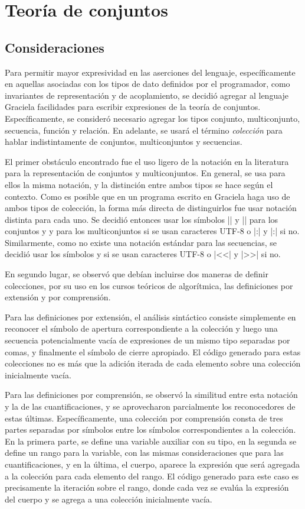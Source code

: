 {{\section{Teoría de conjuntos}
\subsection{Consideraciones}

Para permitir mayor expresividad en las aserciones del lenguaje, específicamente
en aquellas asociadas con los tipos de dato definidos por el programador, como
invariantes de representación y de acoplamiento, se decidió agregar al lenguaje
Graciela facilidades para escribir expresiones de la teoría de conjuntos.
Específicamente, se consideró necesario agregar los tipos conjunto,
multiconjunto, secuencia, función y relación. En adelante, se usará el término
\textit{colección} para hablar indistintamente de conjuntos, multiconjuntos y
secuencias.

El primer obstáculo encontrado fue el uso ligero de la notación en la literatura
para la representación de conjuntos y multiconjuntos. En general, se usa para
ellos la misma notación, y la distinción entre ambos tipos se hace según el
contexto. Como es posible que en un programa escrito en Graciela haga uso de
ambos tipos de colección, la forma más directa de distinguirlos fue usar
notación distinta para cada uno. Se decidió entonces usar los símbolos \ingra|{|
y \ingra|}| para los conjuntos y \Lbag{} y \Rbag{} para los multiconjuntos si se
usan caracteres UTF-8  o \ingra|{:| y \ingra|:}| si no. Similarmente, como no
existe una notación estándar para las secuencias, se decidió usar los símbolos
\Lseq{} y \Rseq{} si se usan caracteres UTF-8 o \ingra|<<| y \ingra|>>| si no.

En segundo lugar, se observó que debían incluirse dos maneras de definir
colecciones, por su uso en los cursos teóricos de algorítmica, las definiciones
por extensión y por comprensión.

Para las definiciones por extensión, el análisis sintáctico consiste simplemente
en reconocer el símbolo de apertura correspondiente a la colección y luego una
secuencia potencialmente vacía de expresiones de un mismo tipo separadas por
comas, y finalmente el símbolo de cierre apropiado. El código generado para
estas colecciones no es más que la adición iterada de cada elemento sobre una
colección inicialmente vacía.

Para las definiciones por comprensión, se observó la similitud entre esta
notación y la de las cuantificaciones, y se aprovecharon parcialmente los
reconocedores de estas últimas. Específicamente, una colección por comprensión
consta de tres partes separadas por símbolos \ingra{|} entre los símbolos
correspondientes a la colección. En la primera parte, se define una variable
auxiliar con su tipo, en la segunda se define un rango para la variable, con las
mismas consideraciones que para las cuantificaciones, y en la última, el cuerpo,
aparece la expresión que será agregada a la colección para cada elemento del
rango. El código generado para este caso es precisamente la iteración sobre el
rango, donde cada vez se evalúa la expresión del cuerpo y se agrega a una
colección inicialmente vacía.

}}
